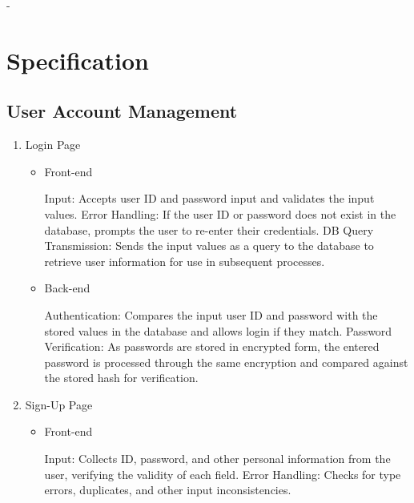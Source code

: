 \documentclass[conference]{IEEEtran}
\begin{document}
-

\section{Specification}

\subsection{User Account Management}

\begin{enumerate}
\setlength{\parindent}{2ex}
\setlength{\parskip}{0.5em}
\item Login Page

\begin{itemize}
\setlength{\parindent}{2ex}
\setlength{\parskip}{0.5em}
\item Front-end

Input: Accepts user ID and password input and validates the input values. \newline\hspace*{1.2ex}
Error Handling: If the user ID or password does not exist in the database, prompts the user to re-enter their credentials.\newline\hspace*{1.2ex}
DB Query Transmission: Sends the input values as a query to the database to retrieve user information for use in subsequent processes.

\item Back-end

Authentication: Compares the input user ID and password with the stored values in the database and allows login if they match. \newline\hspace*{1.2ex}
Password Verification: As passwords are stored in encrypted form, the entered password is processed through the same encryption and compared against the stored hash for verification.

\end{itemize}

\item Sign-Up Page

\begin{itemize}
\setlength{\parindent}{2ex}
\setlength{\parskip}{0.5em}
\item Front-end

Input: Collects ID, password, and other personal information from the user, verifying the validity of each field. \newline\hspace*{1.2ex}
Error Handling: Checks for type errors, duplicates, and other input inconsistencies.


\end{itemize}
\end{enumerate}
\end{document}
